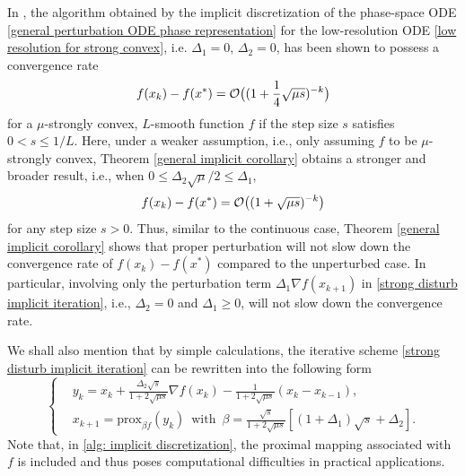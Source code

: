 \documentclass[11pt]{article}
\newcommand{\1}{\mathbf 1}
\numberwithin{equation}{section}
\begin{document}
In \cite[Theorem 3.2(c)]{Shi_2019_acceleration}, the algorithm obtained by the implicit discretization of the phase-space ODE \eqref{general perturbation ODE phase representation} for the low-resolution ODE \eqref{low resolution for strong convex}, i.e. $\Delta_1=0$, $\Delta_2=0$, has been shown to possess a convergence rate 
\[f(x_k)-f(x^*)={\cal O}\big((1+\frac{1}{4}\sqrt{\mu s})^{-k}\big)\]
 for a $\mu$-strongly convex, $L$-smooth function $f$ if the step size $s$ satisfies $0<s\leqslant 1/L$. 
Here, under a weaker assumption, i.e., only assuming $f$ to be $\mu$-strongly convex, Theorem \ref{general implicit corollary} obtains a stronger and broader result, i.e., when  $0\leqslant \Delta_2 \sqrt{\mu}/2 \leqslant \Delta_1$, 
\[f(x_k)-f(x^*)={\cal O}\big((1+\sqrt{\mu s})^{-k}\big)\] for any step size $s>0$.
Thus, similar to the continuous case, Theorem \ref{general implicit corollary} shows that proper perturbation will not slow down the convergence rate of $f(x_k) - f(x^*)$ compared to the unperturbed case. In particular, involving only the perturbation term $\Delta_1 \nabla f(x_{k+1})$ in \eqref{strong disturb implicit iteration}, i.e., $\Delta_2 =0$ and $\Delta_1 \ge 0$, will not slow down the convergence rate.


We shall also mention that by simple calculations,
the iterative scheme \eqref{strong disturb implicit iteration} can be rewritten into the following form 
\begin{equation}
    \label{alg: implicit discretization}
    \left\{
    \begin{aligned}
        & y_k =x_k+\frac{\Delta_2\sqrt{s}}{1+2\sqrt{\mu s}}\nabla f(x_k)-\frac{1}{1+2\sqrt{\mu s}}(x_k-x_{k-1}),\\
     & x_{k+1} =\mathrm{prox}_{\beta f}(y_k) \,  \mbox{ with } \,  \beta=\frac{\sqrt{s}}{1+2\sqrt{\mu s}}[(1+\Delta_1)\sqrt{s}+\Delta_2].
    \end{aligned}
    \right.
\end{equation}
 Note that, in \eqref{alg: implicit discretization}, the proximal mapping associated with $f$ is included and thus poses computational difficulties in practical applications. 
\end{document}
